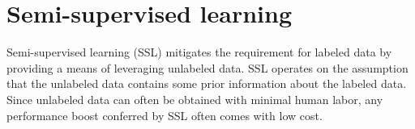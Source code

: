 \section{Semi-supervised learning}
Semi-supervised learning (SSL)\cite{van2020} mitigates the requirement for labeled data by providing a means of leveraging unlabeled data. SSL operates on the assumption that the unlabeled data contains some prior information about the labeled data. Since unlabeled data can often be obtained with minimal human labor, any performance boost conferred by SSL often comes with low cost. \\